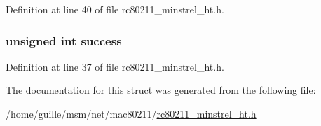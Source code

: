 Definition at line 40 of file rc80211\-\_\-minstrel\-\_\-ht.\-h.

\hypertarget{structminstrel__rate__stats_a5813e0a68f3d46257469abc8784b8e22}{
\subsubsection[{success}]{\setlength{\rightskip}{0pt plus 5cm}unsigned int success}}\label{structminstrel__rate__stats_a5813e0a68f3d46257469abc8784b8e22}


Definition at line 37 of file rc80211\-\_\-minstrel\-\_\-ht.\-h.



The documentation for this struct was generated from the following file\-:\begin{DoxyCompactItemize}
\item 
/home/guille/msm/net/mac80211/\hyperlink{rc80211__minstrel__ht_8h}{rc80211\-\_\-minstrel\-\_\-ht.\-h}\end{DoxyCompactItemize}
